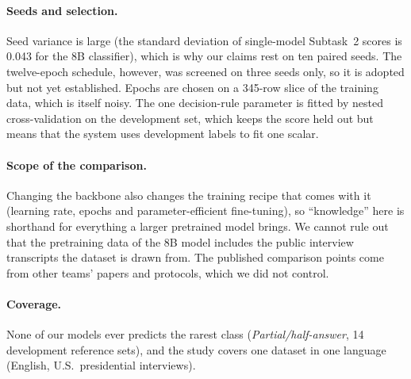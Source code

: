 \paragraph{Seeds and selection.}
Seed variance is large (the standard deviation of single-model Subtask~2 scores is 0.043 for the 8B classifier), which is why our claims rest on ten paired seeds.
The twelve-epoch schedule, however, was screened on three seeds only, so it is adopted but not yet established.
Epochs are chosen on a 345-row slice of the training data, which is itself noisy.
The one decision-rule parameter is fitted by nested cross-validation on the development set, which keeps the score held out but means that the system uses development labels to fit one scalar.

\paragraph{Scope of the comparison.}
Changing the backbone also changes the training recipe that comes with it (learning rate, epochs and parameter-efficient fine-tuning), so ``knowledge'' here is shorthand for everything a larger pretrained model brings.
We cannot rule out that the pretraining data of the 8B model includes the public interview transcripts the dataset is drawn from.
The published comparison points come from other teams' papers and protocols, which we did not control.

\paragraph{Coverage.}
None of our models ever predicts the rarest class (\emph{Partial/half-answer}, 14 development reference sets), and the study covers one dataset in one language (English, U.S.\ presidential interviews).
